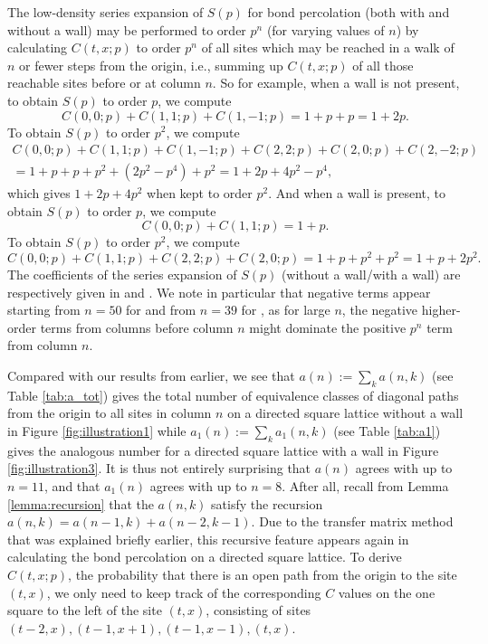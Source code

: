 \documentclass[numbers=enddot,12pt,final,onecolumn,notitlepage]{scrartcl}%
\theoremstyle{definition}
\begin{document}
The low-density series expansion of $S(p)$ for bond percolation (both with and without a wall) may be performed to order $p^n$ (for varying values of $n$) by calculating $C(t, x; p)$ to order $p^n$ of all sites which may be reached in a walk of $n$ or fewer steps from the origin, i.e., summing up $C(t, x; p)$ of all those reachable sites before or at column $n$. So for example, when a wall is not present, to obtain $S(p)$ to order $p$, we compute
\begin{equation*}
C(0, 0; p)+C(1, 1; p)+C(1, -1; p)=1+p+p=1+2p.
\end{equation*}
To obtain $S(p)$ to order $p^2$, we compute
\begin{multline*}
C(0, 0;p)+C(1, 1; p)+C(1, -1; p)+C(2, 2; p)+C(2, 0; p)+C(2, -2; p)\\
=1+p+p+p^2+(2p^2-p^4)+p^2=1+2p+4p^2-p^4,
\end{multline*}
which gives $1+2p+4p^2$ when kept to order $p^2$. And when a wall is present, to obtain $S(p)$ to order $p$, we compute
\begin{equation*}
C(0, 0; p)+C(1, 1; p)=1+p.
\end{equation*}
To obtain $S(p)$ to order $p^2$, we compute
\begin{equation*}
C(0, 0;p)+C(1, 1; p)+C(2, 2; p)+C(2, 0; p)=1+p+p^2+p^2=1+p+2p^2.
\end{equation*}
The coefficients of the series expansion of $S(p)$ (without a wall/with a wall) are respectively given in \cite[A006727]{OEIS} and \cite[A056532]{OEIS}. We note in particular that negative terms appear starting from $n=50$ for \cite[A006727]{OEIS} and from $n=39$ for \cite[A056532]{OEIS}, as for large $n$, the negative higher-order terms from columns before column $n$ might dominate the positive $p^n$ term from column $n$.

Compared with our results from earlier, we see that $a(n):=\sum_k a(n, k)$ (see Table \ref{tab:a_tot}) gives the total number of equivalence classes of diagonal paths from the origin to all sites in column $n$ on a directed square lattice without a wall in Figure \ref{fig:illustration1} while $a_1(n):=\sum_k a_1(n, k)$ (see Table \ref{tab:a1}) gives the analogous number for a directed square lattice with a wall in Figure \ref{fig:illustration3}.
It is thus not entirely surprising that $a(n)$ agrees with \cite[A006727]{OEIS} up to $n=11$, and that $a_1(n)$ agrees with \cite[A056532]{OEIS} up to $n=8$. After all, recall from Lemma \ref{lemma:recursion} that the $a(n,k)$ satisfy the recursion $a(n, k)=a(n-1, k)+a(n-2, k-1)$. Due to the transfer matrix method that was explained briefly earlier, this recursive feature appears again in calculating the bond percolation on a directed square lattice. To derive $C(t, x; p)$, the probability that there is an open path from the origin to the site $(t, x)$, we only need to keep track of the corresponding $C$ values on the one square to the left of the site $(t, x)$, consisting of sites $(t-2, x), (t-1, x+1), (t-1, x-1), (t, x)$.
\end{document}
